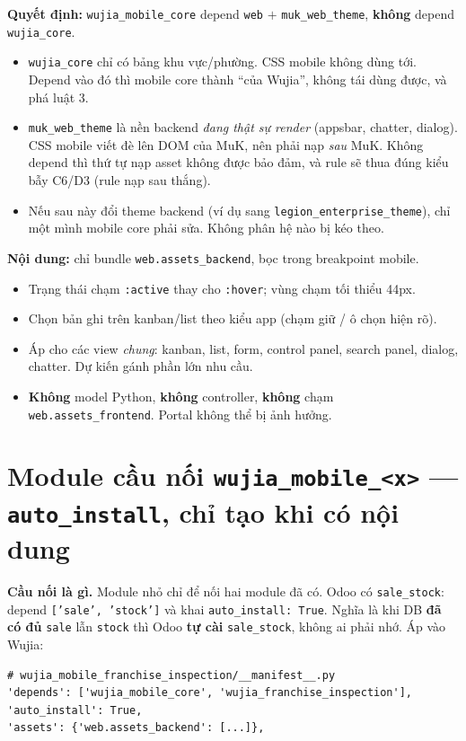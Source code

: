 \textbf{Quyết định:} \texttt{wujia\_mobile\_core} depend \texttt{web} $+$ \texttt{muk\_web\_theme},
\textbf{không} depend \texttt{wujia\_core}.

\begin{itemize}
\item \texttt{wujia\_core} chỉ có bảng khu vực/phường. CSS mobile không dùng tới. Depend vào đó
  thì mobile core thành ``của Wujia'', không tái dùng được, và phá luật 3.
\item \texttt{muk\_web\_theme} là nền backend \emph{đang thật sự render} (appsbar, chatter,
  dialog). CSS mobile viết đè lên DOM của MuK, nên phải nạp \emph{sau} MuK. Không depend thì thứ
  tự nạp asset không được bảo đảm, và rule sẽ thua đúng kiểu bẫy C6/D3 (rule nạp sau thắng).
\item Nếu sau này đổi theme backend (ví dụ sang \texttt{legion\_enterprise\_theme}), chỉ một mình
  mobile core phải sửa. Không phân hệ nào bị kéo theo.
\end{itemize}

\textbf{Nội dung:} chỉ bundle \texttt{web.assets\_backend}, bọc trong breakpoint mobile.
\begin{itemize}
\item Trạng thái chạm \texttt{:active} thay cho \texttt{:hover}; vùng chạm tối thiểu 44px.
\item Chọn bản ghi trên kanban/list theo kiểu app (chạm giữ / ô chọn hiện rõ).
\item Áp cho các view \emph{chung}: kanban, list, form, control panel, search panel, dialog,
  chatter. Dự kiến gánh phần lớn nhu cầu.
\item \textbf{Không} model Python, \textbf{không} controller, \textbf{không} chạm
  \texttt{web.assets\_frontend}. Portal không thể bị ảnh hưởng.
\end{itemize}

\section{Module cầu nối \texttt{wujia\_mobile\_<x>} --- \texttt{auto\_install}, chỉ tạo khi có nội dung}

\textbf{Cầu nối là gì.} Module nhỏ chỉ để nối hai module đã có. Odoo có \texttt{sale\_stock}:
depend \texttt{['sale', 'stock']} và khai \texttt{auto\_install: True}. Nghĩa là khi DB
\textbf{đã có đủ} \texttt{sale} lẫn \texttt{stock} thì Odoo \textbf{tự cài}
\texttt{sale\_stock}, không ai phải nhớ. Áp vào Wujia:

\begin{lstlisting}[style=python]
# wujia_mobile_franchise_inspection/__manifest__.py
'depends': ['wujia_mobile_core', 'wujia_franchise_inspection'],
'auto_install': True,
'assets': {'web.assets_backend': [...]},
\end{lstlisting}

